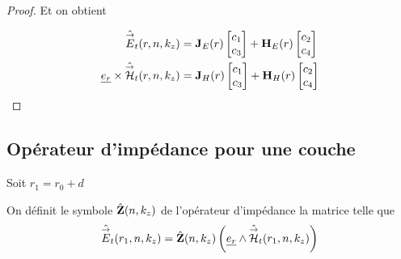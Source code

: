 \begin{proof}
        Et on obtient

        \begin{subequations}
            \label{eq:imp_fourier:cylindre:champs}
            \begin{align}
                \label{eq:imp_fourier:cylindre:champs:E}
                \hat {{\overset{\rightarrow}{E}}}_t(r,n,k_z) &= \mathbf{J}_{E}(r)
                \begin{bmatrix}
                    c_1 \\
                    c_3
                \end{bmatrix}
                +
                \mathbf{H}_{E}(r)
                \begin{bmatrix}
                    c_2 \\
                    c_4
                \end{bmatrix}
                \\
                \label{eq:imp_fourier:cylindre:champs:H}
                \underline{e_r}\times\hat {{\overset{\rightarrow}{\mathcal{H}}}}_t(r,n,k_z) &= 
                \mathbf{J}_{H}(r)
                \begin{bmatrix}
                    c_1 \\
                    c_3
                \end{bmatrix}
                +
                \mathbf{H}_{H}(r)
                \begin{bmatrix}
                    c_2 \\
                    c_4
                \end{bmatrix}
            \end{align}
        \end{subequations}

    \end{proof}



    \subsection{Opérateur d'impédance pour une couche}

        Soit $r_1 = r_0 + d$
        \begin{defn}
            On définit le symbole $\hat {\mathbf{Z}}(n,k_z)$ de l'opérateur d'impédance la matrice telle que
            \begin{equation}
                \hat {{\overset{\rightarrow}{E}}}_t(r_1,n,k_z) = \hat {\mathbf{Z}}(n,k_z) \left(\underline{e_r}\wedge \hat {{\overset{\rightarrow}{\mathcal{H}}}}_t(r_1,n,k_z)\right)
            \end{equation}
        \end{defn}

